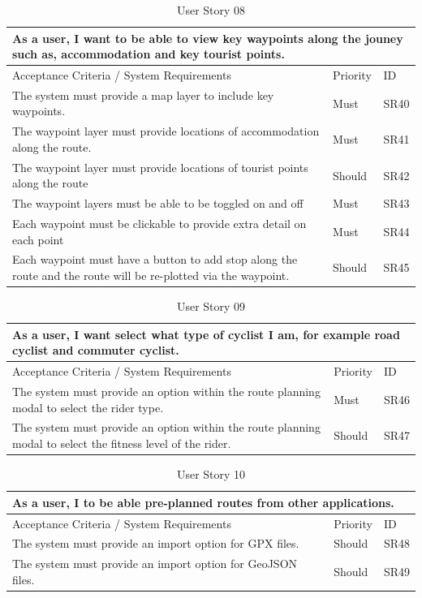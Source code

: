 \begin{table}[!htb]
  \caption{User Story 08}
  \label{tab:user-story-08}
  \begin{tabular}{ p{11cm} p{1cm}  p{1cm} }
  \hline
  \multicolumn{3}{p{13cm}}{As a user, I want to be able to view key waypoints along the jouney such as, accommodation and key tourist points.}\\ 
  \hline
  Acceptance Criteria / System Requirements & Priority & ID\\
  \hline
  The system must provide a map layer to include key waypoints. & Must & SR40 \\
  The waypoint layer must provide locations of accommodation along the route. & Must & SR41\\
  The waypoint layer must provide locations of tourist points along the route & Should & SR42\\
  The waypoint layers must be able to be toggled on and off & Must & SR43\\
  Each waypoint must be clickable to provide extra detail on each point & Must & SR44\\
  Each waypoint must have a button to add stop along the route and the route will be re-plotted via the waypoint. & Should & SR45\\
  \hline
  \end{tabular}
\end{table}

\begin{table}[!htb]
  \caption{User Story 09}
  \label{tab:user-story-09}
  \begin{tabular}{ p{11cm} p{1cm}  p{1cm} }
  \hline
  \multicolumn{3}{p{13cm}}{As a user, I want select what type of cyclist I am, for example road cyclist and commuter cyclist.}\\ 
  \hline
  Acceptance Criteria / System Requirements & Priority & ID\\
  \hline
  The system must provide an option within the route planning modal to select the rider type. & Must & SR46\\
  The system must provide an option within the route planning modal to select the fitness level of the rider. & Should & SR47\\
  \hline
  \end{tabular}
\end{table}

\begin{table}[!htb]
  \caption{User Story 10}
  \label{tab:user-story-10}
  \begin{tabular}{ p{11cm} p{1cm}  p{1cm} }
  \hline
  \multicolumn{3}{p{13cm}}{As a user, I to be able pre-planned routes from other applications.}\\ 
  \hline
  Acceptance Criteria / System Requirements & Priority & ID\\
  \hline
  The system must provide an import option for GPX files. & Should & SR48\\
  The system must provide an import option for GeoJSON files. & Should & SR49\\
  \hline
  \end{tabular}
\end{table}